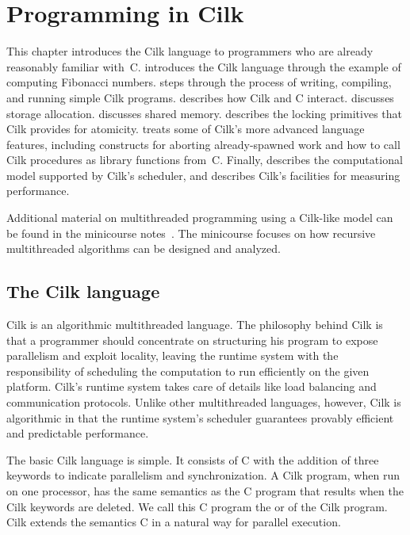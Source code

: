 \chapter{Programming in Cilk}
\label{chap:prog-guide}

This chapter introduces the Cilk language to programmers who are
already reasonably familiar with~C\@.   introduces
the Cilk language through the example of computing Fibonacci numbers.
 steps through the process of writing, compiling,
and running simple Cilk programs.   describes how Cilk
and C interact.   discusses storage allocation.
 discusses shared memory.  describes
the locking primitives that Cilk provides for atomicity.
 treats some of Cilk's more advanced language
features, including constructs for aborting already-spawned work and
how to call Cilk procedures as library functions from~C.  Finally,
 describes the computational model supported by Cilk's
scheduler, and  describes Cilk's facilities for
measuring performance.

Additional material on multithreaded programming using a Cilk-like
model can be found in the minicourse notes~\cite{LeisersonPr98}.  The
minicourse focuses on how recursive multithreaded algorithms can be
designed and analyzed.

\section{The Cilk language}
\label{sec:Cilk-ext}

Cilk is an algorithmic multithreaded language.  The philosophy behind
Cilk is that a programmer should concentrate on structuring his
program to expose parallelism and exploit locality, leaving the
runtime system with the responsibility of scheduling the computation
to run efficiently on the given platform.  Cilk's runtime system takes
care of details like load balancing and communication protocols.
Unlike other multithreaded languages, however, Cilk is algorithmic in
that the runtime system's scheduler guarantees provably efficient and
predictable performance.

The basic Cilk language is simple.  It consists of C with the addition
of three keywords to indicate parallelism and synchronization.  A Cilk
program, when run on one processor, has the same semantics as the C
program that results when the Cilk keywords are deleted.  We call this
C program the  or  of the Cilk program.  Cilk extends the semantics C in a
natural way for parallel execution.

